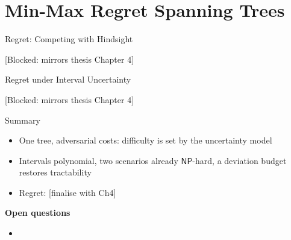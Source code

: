 \documentclass[aspectratio=169,11pt]{beamer}
\begin{document}
\section{Min-Max Regret Spanning Trees}

\begin{frame}{Regret: Competing with Hindsight}
  \begin{center}\textcolor{RWTHOrange}{[Blocked: mirrors thesis Chapter 4]}\end{center}
\end{frame}

\begin{frame}{Regret under Interval Uncertainty}
  \begin{center}\textcolor{RWTHOrange}{[Blocked: mirrors thesis Chapter 4]}\end{center}
\end{frame}


\begin{frame}{Summary}
  \begin{itemize}
    \item One tree, adversarial costs: difficulty is set by the uncertainty model
    \item Intervals polynomial, two scenarios already $\mathsf{NP}$-hard, a deviation budget restores tractability
    \item Regret: \textcolor{RWTHOrange}{[finalise with Ch4]}
  \end{itemize}
  \medskip
  \textcolor{RWTHBlue}{\textbf{Open questions}}
  \begin{itemize}
    \item %
  \end{itemize}
  \bigskip
\end{frame}
\end{document}
